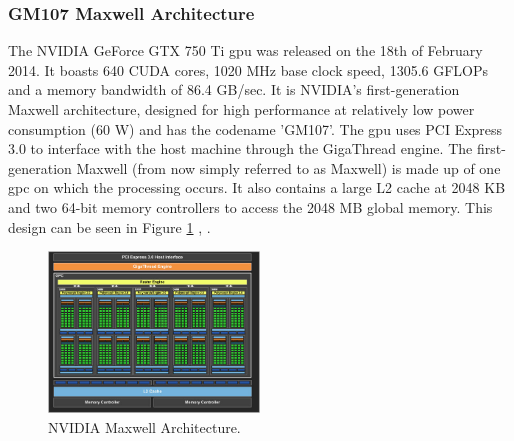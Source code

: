 \subsubsection{GM107 Maxwell Architecture}\label{gpu:ssec:max}
The NVIDIA GeForce GTX 750 Ti \gls{gpu} was released on the 18th of February 2014. It boasts 640 CUDA cores, 1020 MHz base clock speed, 1305.6 GFLOPs and a memory bandwidth of 86.4 GB/sec. It is NVIDIA's first-generation Maxwell architecture, designed for high performance at relatively low power consumption (60 W) and has the codename 'GM107'. The \gls{gpu} uses PCI Express 3.0 to interface with the host machine through the GigaThread engine. The first-generation Maxwell (from now simply referred to as Maxwell) is made up of one \gls{gpc} on which the processing occurs. It also contains a large L2 cache at 2048 KB and two 64-bit memory controllers to access the 2048 MB global memory. This design can be seen in Figure \ref{gpu:img:gm107} \citep{geforce_750}, \citep{g750_paper}.
%
\begin{figure}[H]
 \centering
 \includegraphics[width=0.5\textwidth]{Images/GM107.jpg}
 \caption[]{NVIDIA Maxwell Architecture.\footnotemark}
 \label{gpu:img:gm107}
\end{figure}
%
